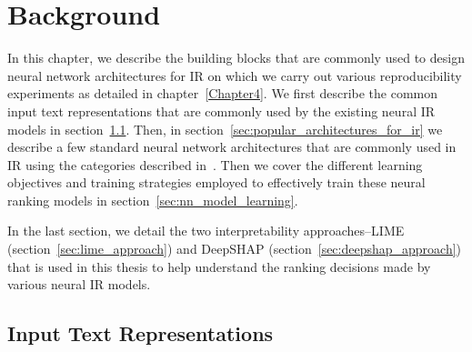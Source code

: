 \chapter{Background} %

\label{Chapter3} %



In this chapter, we describe the building blocks that are commonly used to design neural network architectures for IR on which we carry out various reproducibility experiments as detailed in chapter~\ref{Chapter4}. We first describe the common input text representations that are commonly used by the existing neural IR models in section~\ref{sec:nn_input_text_repr}. Then, in section~\ref{sec:popular_architectures_for_ir} we describe a few standard neural network architectures that are commonly used in IR using the categories described in~\cite{mitra18_nir_intro}. Then we cover the different learning objectives and training strategies employed to effectively train these neural ranking models in section~\ref{sec:nn_model_learning}.

In the last section, we detail the two interpretability approaches--LIME (section~\ref{sec:lime_approach}) and DeepSHAP (section~\ref{sec:deepshap_approach}) that is used in this thesis to help understand the ranking decisions made by various neural IR models. 

\section{Input Text Representations}
\label{sec:nn_input_text_repr}

